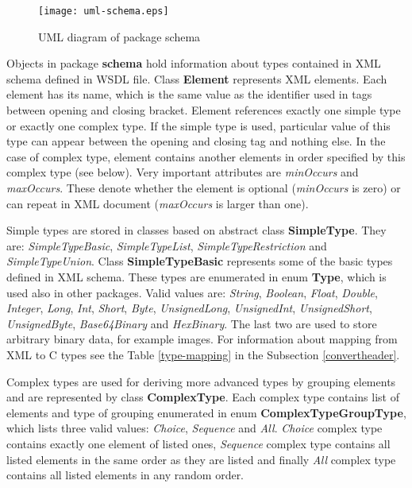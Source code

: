 \documentclass[12pt,notitlepage]{report}
\begin{document}
\begin{figure}[htb]
 \begin{center}
  \texttt{[image: uml-schema.eps]}
 \end{center}
 \caption{UML diagram of package schema}
 \label{uml-schema}
\end{figure}

Objects in package \textbf{schema} hold information about types contained in XML schema defined in WSDL file. Class \textbf{Element} represents XML elements. Each element has its name, which is the same value as the identifier used in tags between opening and closing bracket. Element references exactly one simple type or exactly one complex type. If the simple type is used, particular value of this type can appear between the opening and closing tag and nothing else. In the case of complex type, element contains another elements in order specified by this complex type (see below). Very important attributes are \textit{minOccurs} and \textit{maxOccurs}. These denote whether the element is optional (\textit{minOccurs} is zero) or can repeat in XML document (\textit{maxOccurs} is larger than one).

Simple types are stored in classes based on abstract class \textbf{SimpleType}. They are: \textit{SimpleTypeBasic}, \textit{SimpleTypeList}, \textit{SimpleTypeRestriction} and \textit{SimpleTypeUnion}. Class \textbf{SimpleTypeBasic} represents some of the basic types defined in XML schema. These types are enumerated in enum \textbf{Type}, which is used also in other packages. Valid values are: \textit{String}, \textit{Boolean}, \textit{Float}, \textit{Double}, \textit{Integer}, \textit{Long}, \textit{Int}, \textit{Short}, \textit{Byte}, \textit{UnsignedLong}, \textit{UnsignedInt}, \textit{UnsignedShort}, \textit{UnsignedByte}, \textit{Base64Binary} and \textit{HexBinary}. The last two are used to store arbitrary binary data, for example images. For information about mapping from XML to C types see the Table \ref{type-mapping} in the Subsection \ref{convertheader}.

Complex types are used for deriving more advanced types by grouping elements and are represented by class \textbf{ComplexType}. Each complex type contains list of elements and type of grouping enumerated in enum \textbf{ComplexTypeGroupType}, which lists three valid values: \textit{Choice}, \textit{Sequence} and \textit{All}. \textit{Choice} complex type contains exactly one element of listed ones, \textit{Sequence} complex type contains all listed elements in the same order as they are listed and finally \textit{All} complex type contains all listed elements in any random order.
\end{document}

